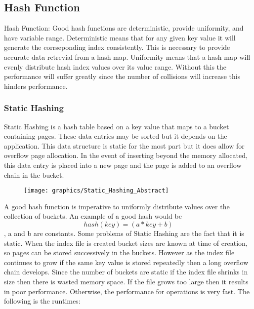 \documentclass[letterpaper, 12pt]{article}
\begin{document}
\subsection{Hash Function}
Hash Function:
Good hash functions are deterministic, provide uniformity, and have variable range. Deterministic means
that for any given key value it will generate the corrseponding index consistently. This is
necessary to provide accurate data retrevial from a hash map. Uniformity means that a hash
map will evenly distribute hash index values over its value range. Without this the
performance will suffer greatly since the number of collisions will increase this hinders performance.
\subsubsection{Static Hashing}
Static Hashing is a hash table based on a key value that maps to a bucket containing pages. These
data entries may be sorted but it depends on the application. This data structure is static
for the most part but it does allow for overflow page allocation. In the event of inserting
beyond the memory allocated, this data entry is placed into a new page and the page is added
to an overflow chain in the bucket.
\par\vspace{\baselineskip}
\begin{figure}
  \centering
  \texttt{[image: graphics/Static\_Hashing\_Abstract]}
  \cite{ramakrishnan2000database}
\end{figure}

A good hash function is imperative to uniformly distribute values over the collection of buckets.
An example of a good hash would be \[hash(key) = (a*key + b)\], a and b are constants. Some problems
of Static Hashing are the fact that it is static. When the index file is created bucket sizes
are known at time of creation, so pages can be stored successively in the buckets. However
as the index file continues to grow if the same key value is stored repeatedly then a long
overflow chain develops. Since the number of buckets are static if the index file shrinks
in size then there is wasted memory space. If the file grows too large then it results in
poor performance. Otherwise, the performance for operations is very fast. The following
is the runtimes:

\par\vspace{\baselineskip}
\end{document}
